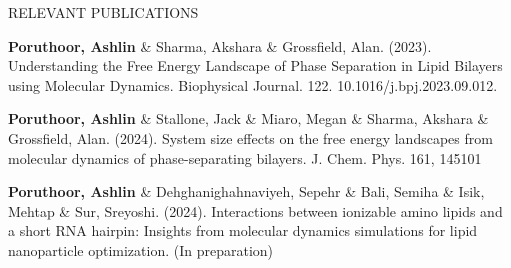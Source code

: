 \documentclass{resume} %
\begin{document}



\begin{rSection}{RELEVANT PUBLICATIONS}

   \item \textbf{Poruthoor, Ashlin} \& Sharma, Akshara \& Grossfield, Alan. (2023). Understanding the Free Energy Landscape of Phase Separation in Lipid Bilayers using Molecular Dynamics. Biophysical Journal. 122. 10.1016/j.bpj.2023.09.012.
   \item \textbf{Poruthoor, Ashlin} \& Stallone, Jack \& Miaro, Megan \& Sharma, Akshara \& Grossfield, Alan. (2024). System size effects on the free energy landscapes from molecular dynamics of phase-separating bilayers. J. Chem. Phys. 161, 145101
   \item \textbf{Poruthoor, Ashlin} \& Dehghanighahnaviyeh, Sepehr \& Bali, Semiha \& Isik, Mehtap \& Sur, Sreyoshi. (2024). Interactions between ionizable amino lipids and a short RNA hairpin: Insights from molecular dynamics simulations for lipid nanoparticle optimization. (In preparation)

\end{rSection}
\end{document}
